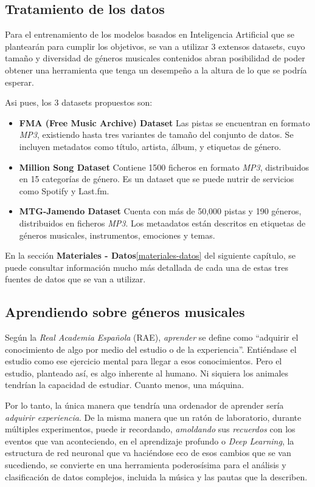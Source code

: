 \subsection{Tratamiento de los datos}
\label{tratamiento-datos}

Para el entrenamiento de los modelos basados en Inteligencia Artificial que se plantearán para cumplir los objetivos, se van a utilizar 3 extensos datasets, cuyo tamaño y diversidad de géneros musicales contenidos abran posibilidad de poder obtener una herramienta que tenga un desempeño a la altura de lo que se podría esperar.

Asi pues, los 3 datasets propuestos son:

\begin{itemize}
    \item \textbf{FMA (Free Music Archive) Dataset}
        Las pistas se encuentran en formato \emph{MP3}, existiendo hasta tres variantes de tamaño del conjunto de datos.
        Se incluyen metadatos como título, artista, álbum, y etiquetas de género.
    \item \textbf{Million Song Dataset}
        Contiene 1500 ficheros en formato \emph{MP3}, distribuidos en 15 categorías de género. Es un dataset que se puede nutrir de servicios como Spotify y Last.fm.
    \item \textbf{MTG-Jamendo Dataset}
       Cuenta con más de 50,000 pistas y 190 géneros, distribuidos en ficheros \emph{MP3}. Los metaadatos están descritos en etiquetas de géneros musicales, instrumentos, emociones y temas.
\end{itemize}
En la sección \textbf{Materiales - Datos}\ref{materiales-datos} del siguiente capítulo, se puede consultar información mucho más detallada de cada una de estas tres fuentes de datos que se van a utilizar.

\subsection{Aprendiendo sobre géneros musicales}

Según la \emph{Real Academia Española} (RAE), \emph{aprender} se define como ``adquirir el conocimiento de algo por medio del estudio o de la experiencia''\citep{rae_aprender}. Entiéndase el estudio como ese ejercicio mental para llegar a esos conocimientos. Pero el estudio, planteado así, es algo inherente al humano. Ni siquiera los animales tendrían la capacidad de estudiar. Cuanto menos, una máquina.

Por lo tanto, la única manera que tendría una ordenador de aprender sería \emph{adquirir experiencia}. De la misma manera que un ratón de laboratorio, durante múltiples experimentos, puede ir recordando, \emph{amoldando} sus \emph{recuerdos} con los eventos que van aconteciendo, en el aprendizaje profundo o \emph{Deep Learning}, la estructura de red neuronal que va haciéndose eco de esos cambios que se van sucediendo, se convierte en una herramienta poderosísima para el análisis y clasificación de datos complejos, incluida la música y las pautas que la describen. 

